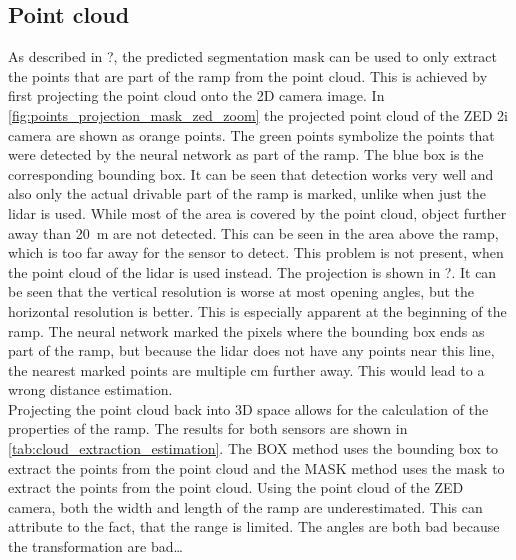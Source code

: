 \subsection{Point cloud}
As described in ?, the predicted segmentation mask can be used to only extract the points that are part of the ramp from the point cloud.
This is achieved by first projecting the point cloud onto the 2D camera image.
In \cref{fig:points_projection_mask_zed_zoom} the projected point cloud of the ZED 2i camera are shown as orange points.
The green points symbolize the points that were detected by the neural network as part of the ramp.
The blue box is the corresponding bounding box.
It can be seen that detection works very well and also only the actual drivable part of the ramp is marked, unlike when just the \gls{lidar} is used.
While most of the area is covered by the point cloud, object further away than \SI{20}{\metre} are not detected.
This can be seen in the area above the ramp, which is too far away for the sensor to detect.
This problem is not present, when the point cloud of the \gls{lidar} is used instead.
The projection is shown in ?.
It can be seen that the vertical resolution is worse at most opening angles, but the horizontal resolution is better.
This is especially apparent at the beginning of the ramp.
The neural network marked the pixels where the bounding box ends as part of the ramp, but because the \gls{lidar} does not have any points near this line, the nearest marked points are multiple \si{\cm} further away.
This would lead to a wrong distance estimation.\\
Projecting the point cloud back into 3D space allows for the calculation of the properties of the ramp.
The results for both sensors are shown in \cref{tab:cloud_extraction_estimation}.
The BOX method uses the bounding box to extract the points from the point cloud and the MASK method uses the mask to extract the points from the point cloud.
Using the point cloud of the ZED camera, both the width and length of the ramp are underestimated.
This can attribute to the fact, that the range is limited.
The angles are both bad because the transformation are bad\dots
{}


